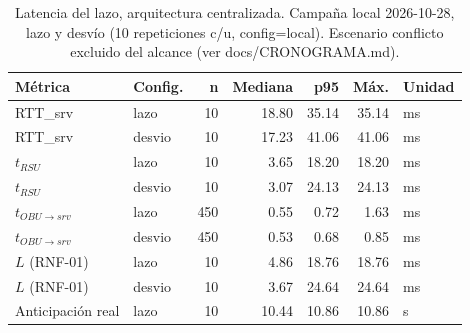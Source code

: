 \begin{table}[H]
\centering
\caption{Latencia del lazo, arquitectura centralizada. Campaña local 2026-10-28, lazo y desvío (10 repeticiones c/u, config=local). Escenario conflicto excluido del alcance (ver docs/CRONOGRAMA.md).}
\label{tab:latencia_campana_centralizada}
\small
\begin{tabular}{llrrrrl}
\toprule
\textbf{Métrica} & \textbf{Config.} & \textbf{n} & \textbf{Mediana} & \textbf{p95} & \textbf{Máx.} & \textbf{Unidad} \\
\midrule
RTT\_srv & lazo & 10 & 18.80 & 35.14 & 35.14 & ms \\
RTT\_srv & desvio & 10 & 17.23 & 41.06 & 41.06 & ms \\
$t_{RSU}$ & lazo & 10 & 3.65 & 18.20 & 18.20 & ms \\
$t_{RSU}$ & desvio & 10 & 3.07 & 24.13 & 24.13 & ms \\
$t_{OBU\to srv}$ & lazo & 450 & 0.55 & 0.72 & 1.63 & ms \\
$t_{OBU\to srv}$ & desvio & 450 & 0.53 & 0.68 & 0.85 & ms \\
$L$ (RNF-01) & lazo & 10 & 4.86 & 18.76 & 18.76 & ms \\
$L$ (RNF-01) & desvio & 10 & 3.67 & 24.64 & 24.64 & ms \\
Anticipación real & lazo & 10 & 10.44 & 10.86 & 10.86 & s \\
\bottomrule
\end{tabular}
\end{table}
